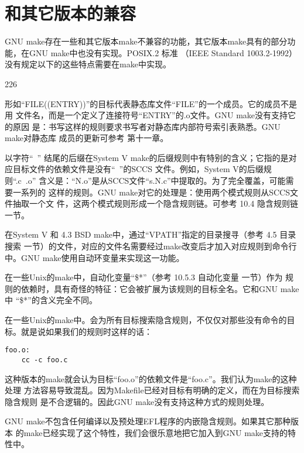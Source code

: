 ﻿\chapter{和其它版本的兼容}
GNU make存在一些和其它版本make不兼容的功能，其它版本make具有的部分功能，在GNU make中也没有实现。POSIX.2 标准 （IEEE Standard 1003.2-1992）没有规定以下的这些特点需要在make中实现。

\begin{dinglist}{226}
\itemsep=4pt

\item 形如“FILE((ENTRY))”的目标代表静态库文件“FILE”的一个成员。它的成员不是用
    文件名，而是一个定义了连接符号“ENTRY”的.o文件。GNU make没有支持它的原因
    是：书写这样的规则要求书写者对静态库内部符号索引表熟悉。GNU make对静态库
    成员的更新可参考 第十一章。

\item 以字符“~” 结尾的后缀在System V make的后缀规则中有特别的含义；它指的是对
    应目标文件的依赖文件是没有“~”的SCCS 文件。例如，System V的后缀规则“.c~.o”
    含义是：“N.o”是从SCCS文件“s.N.c”中提取的。为了完全覆盖，可能需要一系列的
    这样的规则。GNU make对它的处理是：使用两个模式规则从SCCS文件抽取一个文
    件，这两个模式规则形成一个隐含规则链。可参考 10.4 隐含规则链 一节。

\item 在System V 和 4.3 BSD make中，通过“VPATH”指定的目录搜寻（参考 4.5 目录
    搜索 一节）的文件，对应的文件名需要经过make改变后才加入对应规则到命令行
    中。GNU make使用自动环变量来实现这一功能。

\item 在一些Unix的make中，自动化变量“\$*”（参考 10.5.3 自动化变量 一节）作为
    规
    则的依赖时，具有奇怪的特征：它会被扩展为该规则的目标全名。它和GNU make中
    “\$*”的含义完全不同。

\item  在一些Unix的make中。会为所有目标搜索隐含规则，不仅仅对那些没有命令的目
    标。就是说如果我们的规则时这样的话：

\begin{Verbatim}[]
foo.o:
    cc -c foo.c
\end{Verbatim}

这种版本的make就会认为目标“foo.o”的依赖文件是“foo.c”。我们认为make的这种处理
方法容易导致混乱。因为Makefile已经对目标有明确的定义，而在为目标搜索隐含规则
是不合逻辑的。因此GNU make没有支持这种方式的规则处理。


\item GNU make不包含任何编译以及预处理EFL程序的内嵌隐含规则。如果其它那种版本
    的make已经实现了这个特性，我们会很乐意地把它加入到GNU make支持的特性中。


\end{dinglist}
